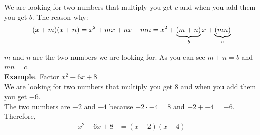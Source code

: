 We are looking for two numbers that multiply you get $c$ and when you add them you get $b$.
The reason why: 
$$ (x + m)(x + n) = \\ x^2 + mx + nx + mn = x^2 + \underbrace{(m + n)}_b x + \underbrace{(mn)}_c $$

$m$ and $n$ are the two numbers we are looking for. As you can see $m + n = b$ and $mn = c$. \\

\textbf{Example}. Factor $x^2 - 6x + 8$ \\
We are looking for two numbers that multiply you get $8$ and when you add them you get $-6$. \\
The two numbers are $-2$ and $-4$ because $-2 \cdot -4 = 8$ and $-2 + -4 = -6$. \\
Therefore, 
\begin{align*}
    x^2 - 6x + 8 &= (x - 2)(x - 4) \\
\end{align*}

